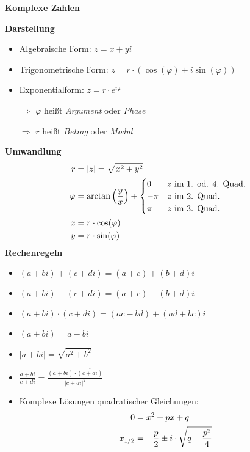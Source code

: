 \documentclass[10pt,landscape,a4paper]{article}
\begin{document}
\raggedright
\footnotesize
\begin{multicols*}{4}


\setlength{\columnseprule}{0.1pt}
\setlength{\premulticols}{1pt}
\setlength{\postmulticols}{1pt}
\setlength{\multicolsep}{1pt}
\setlength{\columnsep}{1pt}

\begin{center}
	\normalsize{\textbf{Komplexe Zahlen}}
\end{center}
\textbf{Darstellung}
\begin{itemize}
	\item Algebraische Form: $z=x+yi$
	\item Trigonometrische Form: $z=r\cdot (\cos(\varphi) + i\sin(\varphi))$
	\item Exponentialform: $z=r\cdot e^{i\varphi}$
	\item[$\Rightarrow$] $\varphi$ heißt \textit{Argument} oder \textit{Phase}
	\item[$\Rightarrow$] $r$ heißt \textit{Betrag} oder \textit{Modul}
\end{itemize}
\textbf{Umwandlung}
\begin{align}
	r &= \vert z\vert=\sqrt{x^2+y^2} \notag \\
	\varphi &= \arctan\left(\frac{y}{x}\right) + \begin{cases}
		0 &z \text{ im 1. od. 4. Quad.} \\
		-\pi &z \text{ im 2. Quad.} \\
		\pi &z \text{ im 3. Quad.}
	\end{cases} \notag \\
	x &= r\cdot \cos(\varphi) \notag \\
	y &= r\cdot \sin(\varphi) \notag
\end{align}
\textbf{Rechenregeln}
\begin{itemize}
	\item $(a+bi)+(c+di) = (a+c) + (b+d)i$
	\item $(a+bi)-(c+di) = (a+c) - (b+d)i$
	\item $(a+bi)\cdot (c+di) = (ac-bd) + (ad+bc)i$
	\item $\overline{(a+bi)} = a-bi$
	\item $\vert a+bi\vert = \sqrt{a^2+b^2}$
	\item $\frac{a+bi}{c+di}=\frac{(a+bi)\cdot\overline{(c+di)}}{\vert c+di\vert^2}$
	\item Komplexe Lösungen quadratischer Gleichungen:
	\begin{align}
		0 &= x^2 + px + q \notag \\
		x_{1/2} &= -\frac{p}{2} \pm i\cdot\sqrt{q-\frac{p^2}{4}} \notag
	\end{align}
\end{itemize}


\end{multicols*}
\end{document}
